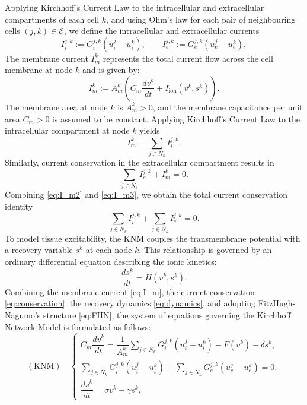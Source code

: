 \documentclass[a4paper,11pt]{article}
\theoremstyle{definition}
\numberwithin{equation}{section}
\begin{document}
Applying Kirchhoff's Current Law to the intracellular and extracellular compartments of each cell $k$, and using Ohm's law for each pair of neighbouring cells \((j,k) \in \mathcal{E}\), we define the intracellular and extracellular currents
\begin{equation*}
	I_i^{j,k} := G_i^{j,k} (u_i^j - u_i^k), \qquad
	I_e^{j,k} := G_e^{j,k} (u_e^j - u_e^k),
\end{equation*}
The membrane current $I_m^k$ represents the total current flow across the cell membrane at node $k$ and is given by:
\begin{equation}
	\label{eq:I_m}
	I_m^k := A_m^k \left( C_m \frac{dv^k}{dt} + I_{\text{ion}}(v^k, s^k) \right).
\end{equation}
The membrane area at node \(k\) is \(A_m^k > 0\), and the membrane capacitance per unit area \(C_m > 0\) is assumed to be constant. Applying Kirchhoff's Current Law  to the intracellular compartment at node $k$ yields
\begin{equation}
	\label{eq:I_m2}
	I_m^k = \sum_{j \in  N_{k}} I_i^{j,k}.
\end{equation}
Similarly, current conservation in the extracellular compartment results in
\begin{equation}
	\label{eq:I_m3}
	\sum_{j \in  N_{k}} I_e^{j,k} + I_m^k = 0.
\end{equation}
Combining \eqref{eq:I_m2} and \eqref{eq:I_m3}, we obtain the total current conservation identity
\begin{equation}
	\label{eq:conservation}
	\sum_{j \in  N_{k}} I_i^{j,k} + \sum_{j \in  N_{k}} I_e^{j,k} = 0.
\end{equation}
To model tissue excitability, the KNM couples the transmembrane potential with a recovery variable $s^k$ at each node $k$. This relationship is governed by an ordinary differential equation describing the ionic kinetics:
\begin{equation}
	\label{eq:dynamics}
	\dfrac{ds^{k}}{dt} = H(v^{k}, s^{k}).
\end{equation}
Combining the membrane current \eqref{eq:I_m}, the current conservation \eqref{eq:conservation}, the recovery dynamics \eqref{eq:dynamics}, and adopting FitzHugh-Nagumo's structure \eqref{eq:FHN}, the system of equations governing the Kirchhoff Network Model is formulated as follows:
\begin{equation*}
	(\text{KNM} ) \quad \left\{
	\begin{array}{ll}
		C_{m}\dfrac{dv^{k}}{dt}=\dfrac{1}{A_{m}^{k}}\displaystyle\sum_{j \in  N_{k}}G_{i}^{j,k} (u_{i}^{j}-u_{i}^{k})-F(v^{k}) -\delta s^{k},\\
		\displaystyle\sum_{j \in  N_{k}} G_{i}^{j,k} (u_{i}^{j}-u_{i}^{k})+\displaystyle\sum_{j \in  N_{k}} G_{e}^{j,k} (u_{e}^{j}-u_{e}^{k})=0,\\
		\dfrac{ds^{k}}{dt}=\sigma v^{k} -\gamma s^{k}, 
	\end{array}
	\right.
\end{equation*}
\end{document}
